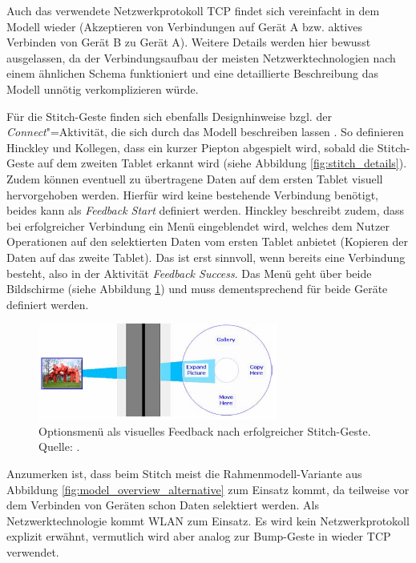 Auch das verwendete Netzwerkprotokoll TCP findet sich vereinfacht in dem Modell wieder (Akzeptieren von Verbindungen auf Gerät A bzw. aktives Verbinden von Gerät B zu Gerät A). Weitere Details werden hier bewusst ausgelassen, da der Verbindungsaufbau der meisten Netzwerktechnologien nach einem ähnlichen Schema funktioniert und eine detaillierte Beschreibung das Modell unnötig verkomplizieren würde.

Für die Stitch-Geste finden sich ebenfalls Designhinweise bzgl. der \textit{Connect}"=Aktivität, die sich durch das Modell beschreiben lassen \citep{Hinckley2004}. So definieren Hinckley und Kollegen, dass ein kurzer Piepton abgespielt wird, sobald die Stitch-Geste auf dem zweiten Tablet erkannt wird (siehe Abbildung \ref{fig:stitch_details}). Zudem können eventuell zu übertragene Daten auf dem ersten Tablet visuell hervorgehoben werden. Hierfür wird keine bestehende Verbindung benötigt, beides kann als \textit{Feedback Start} definiert werden. Hinckley beschreibt zudem, dass bei erfolgreicher Verbindung ein Menü eingeblendet wird, welches dem Nutzer Operationen auf den selektierten Daten vom ersten Tablet anbietet (\zb Kopieren der Daten auf das zweite Tablet). Das ist erst sinnvoll, wenn bereits eine Verbindung besteht, also in der Aktivität \textit{Feedback Success}. Das Menü geht über beide Bildschirme (siehe Abbildung \ref{fig:stitch_menu}) und muss dementsprechend für beide Geräte definiert werden.
\begin{figure}[h]
\centering
\includegraphics[width=0.7\textwidth]{bilder/stitch_menu.png}
\caption{Optionsmenü als visuelles Feedback nach erfolgreicher Stitch-Geste. Quelle: \citep{Hinckley2004}.}
\label{fig:stitch_menu}
\end{figure}

Anzumerken ist, dass beim Stitch meist die Rahmenmodell-Variante aus Abbildung \ref{fig:model_overview_alternative} zum Einsatz kommt, da teilweise vor dem Verbinden von Geräten schon Daten selektiert werden. Als Netzwerktechnologie kommt WLAN zum Einsatz. Es wird kein Netzwerkprotokoll explizit erwähnt, vermutlich wird aber analog zur Bump-Geste in \citep{Hinckley2003} wieder \acs{TCP} verwendet.

